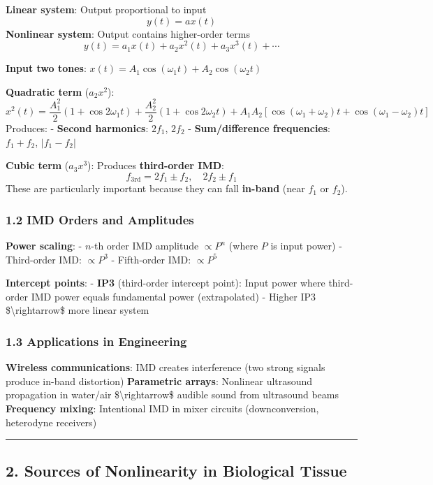 \textbf{Linear system}: Output proportional to input \[y(t) = a x(t)\]
\textbf{Nonlinear system}: Output contains higher-order terms
\[y(t) = a_1 x(t) + a_2 x^2(t) + a_3 x^3(t) + \cdots\]

\textbf{Input two tones}:
\(x(t) = A_1 \cos(\omega_1 t) + A_2 \cos(\omega_2 t)\)

\textbf{Quadratic term} (\(a_2 x^2\)):
\[x^2(t) = \frac{A_1^2}{2} (1 + \cos 2\omega_1 t) + \frac{A_2^2}{2} (1 + \cos 2\omega_2 t) + A_1 A_2 [\cos(\omega_1 + \omega_2)t + \cos(\omega_1 - \omega_2)t]\]
Produces: - \textbf{Second harmonics}: \(2f_1\), \(2f_2\) -
\textbf{Sum/difference frequencies}: \(f_1 + f_2\), \(|f_1 - f_2|\)

\textbf{Cubic term} (\(a_3 x^3\)): Produces \textbf{third-order IMD}:
\[f_{3\text{rd}} = 2f_1 \pm f_2, \quad 2f_2 \pm f_1\] These are
particularly important because they can fall \textbf{in-band} (near
\(f_1\) or \(f_2\)).

\subsubsection{1.2 IMD Orders and
Amplitudes}\label{imd-orders-and-amplitudes}

\textbf{Power scaling}: - \(n\)-th order IMD amplitude \(\propto P^n\)
(where \(P\) is input power) - Third-order IMD: \(\propto P^3\) -
Fifth-order IMD: \(\propto P^5\)

\textbf{Intercept points}: - \textbf{IP3} (third-order intercept point):
Input power where third-order IMD power equals fundamental power
(extrapolated) - Higher IP3 \$\textbackslash rightarrow\$ more linear
system

\subsubsection{1.3 Applications in
Engineering}\label{applications-in-engineering}

\textbf{Wireless communications}: IMD creates interference (two strong
signals produce in-band distortion) \textbf{Parametric arrays}:
Nonlinear ultrasound propagation in water/air
\$\textbackslash rightarrow\$ audible sound from ultrasound beams
\textbf{Frequency mixing}: Intentional IMD in mixer circuits
(downconversion, heterodyne receivers)

\begin{center}\rule{0.5\linewidth}{0.5pt}\end{center}

\subsection{2. Sources of Nonlinearity in Biological
Tissue}\label{sources-of-nonlinearity-in-biological-tissue}

